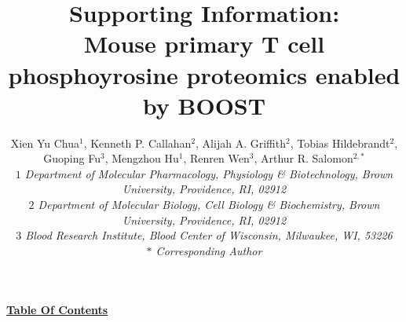 \documentclass[journal=jprobs,manuscript=article]{achemso}
\title{Supporting Information:  \\Mouse primary T cell phosphoyrosine proteomics enabled by BOOST}
\author{Xien Yu Chua$^{1}$, Kenneth P. Callahan$^{2}$, Alijah A. Griffith$^{2}$, Tobias Hildebrandt$^{2}$, Guoping Fu$^{3}$, Mengzhou Hu$^{1}$, Renren Wen$^{3}$, Arthur R. Salomon$^{2,*}$
\\
\singlespacing
\textit{\small{$1$ Department of Molecular Pharmacology, Physiology \& Biotechnology, Brown University, Providence, RI, 02912}}
\\
\textit{\small{$2$ Department of Molecular Biology, Cell Biology \& Biochemistry, Brown University, Providence, RI, 02912}}
\\
\textit{\small{$3$ Blood Research Institute, Blood Center of Wisconsin, Milwaukee, WI, 53226}}
\\
\textit{\small{$*$} Corresponding Author}\tiny}
\begin{document}
\thispagestyle{firststyle}
\newpage
\begin{center}
\textbf{\underline{\large{Table Of Contents}}}
\end{center}

%
%
\setcounter{page}{1}
\end{document}
